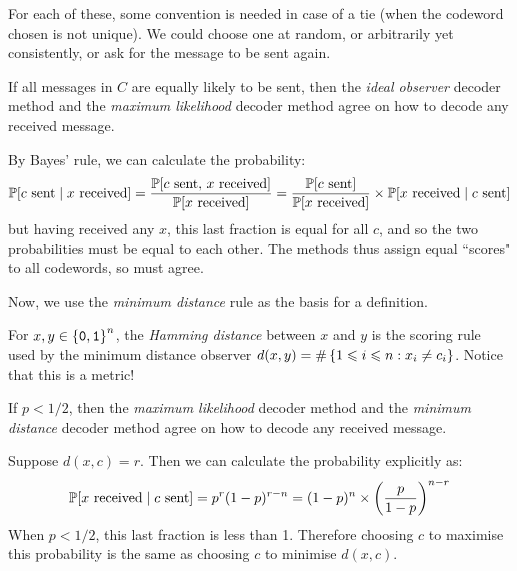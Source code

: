 \documentclass{article}
\begin{document}
\begin{note}
	For each of these, some convention is needed in case of a tie (when the codeword chosen is not unique). We could choose one at random, or arbitrarily yet consistently, or ask for the message to be sent again.
\end{note}

\begin{proposition}
	\label{decoder-agreement-ideal-observer-max-likelihood}
    If all messages in $C$ are equally likely to be sent, then the \textit{ideal observer} decoder method and the \textit{maximum likelihood} decoder method agree on how to decode any received message.
\end{proposition}
\begin{prf}
    By Bayes' rule, we can calculate the probability:
    \[
	\P[c \text{ sent} \mid x \text{ received}] = \frac{\P[c \text{ sent}, \, x \text{ received}]}{\P[x \text{ received}]} = \frac{\P[c \text{ sent}]}{\P[x \text{ received}]} \times \P[x \text{ received} \mid c \text{ sent}]
	\]
	but having received any $x$, this last fraction is equal for all $c$, and so the two probabilities must be equal to each other. The methods thus assign equal ``scores" to all codewords, so must agree.
\end{prf}

Now, we use the \textit{minimum distance} rule as the basis for a definition.

\begin{definition}
	\label{hamming-distance}
    For $x, y \in \binset^n$, the \textit{Hamming distance} between $x$ and $y$ is the scoring rule used by the minimum distance observer $d(x, y) = \#\set{1 \leq i \leq n : x_i \neq c_i}$. Notice that this is a metric!
\end{definition}

\begin{proposition}
	\label{decoder-agreement-max-likelihood-min-distance}
    If $p < 1/2$, then the \textit{maximum likelihood} decoder method and the \textit{minimum distance} decoder method agree on how to decode any received message.
\end{proposition}
\begin{prf}
	Suppose $d(x, c) = r$. Then we can calculate the probability explicitly as:
	\[
	\P[x \text{ received} \mid c \text{ sent}] = p^r(1-p)^{r-n} = (1-p)^n
 \times \left( \frac{p}{1-p} \right)^{n-r}
	\]
	When $p < 1/2$, this last fraction is less than 1. Therefore choosing $c$ to maximise this probability is the same as choosing $c$ to minimise $d(x, c)$.
\end{prf}
\end{document}
